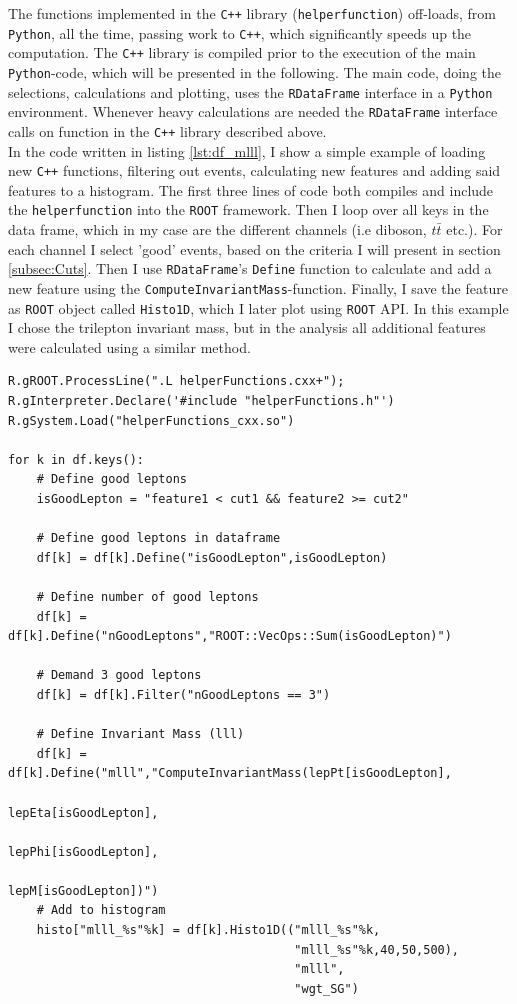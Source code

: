 The functions implemented in the \verb!C++! library (\texttt{helperfunction}) off-loads, from \verb!Python!, all the time, passing work to \verb!C++!,
which significantly speeds up the computation. The \verb!C++! library is compiled prior to the execution of the main \verb!Python!-code, which 
will be presented in the following. The main code, doing the selections, calculations and plotting, uses the \verb!RDataFrame! interface in a \verb!Python! 
environment. Whenever heavy calculations are needed the \verb!RDataFrame! interface calls on function in the \verb!C++! library described above. 
\\
In the code written in listing \ref{lst:df_mlll}, I show a simple example 
of loading new \verb!C++! functions, filtering out events, calculating new features and adding said 
features to a histogram. The first three lines of code both compiles and include the \texttt{helperfunction} 
into the \verb!ROOT! framework. Then I loop over all keys in the data frame, which in my case
are the different channels (i.e diboson, $t\bar{t}$ etc.). For each channel I select 'good' events,
based on the criteria I will present in section \ref{subsec:Cuts}. Then I use \verb!RDataFrame!'s \texttt{Define} function to calculate
and add a new feature using the \texttt{ComputeInvariantMass}-function. Finally, I save the feature as \verb!ROOT! object called 
\texttt{Histo1D}, which I later plot using \verb!ROOT! \ac{API}. In this example I chose the trilepton invariant mass, 
but in the analysis all additional features were calculated using a similar method. 
\lstset{style=Python}
\begin{lstlisting}[caption={Python-file for calling dataframe and calculating $M_{lll}$.},captionpos=b, label={lst:df_mlll}]
R.gROOT.ProcessLine(".L helperFunctions.cxx+");
R.gInterpreter.Declare('#include "helperFunctions.h"') 
R.gSystem.Load("helperFunctions_cxx.so")

for k in df.keys():
    # Define good leptons
    isGoodLepton = "feature1 < cut1 && feature2 >= cut2"

    # Define good leptons in dataframe
    df[k] = df[k].Define("isGoodLepton",isGoodLepton)

    # Define number of good leptons
    df[k] = df[k].Define("nGoodLeptons","ROOT::VecOps::Sum(isGoodLepton)")

    # Demand 3 good leptons 
    df[k] = df[k].Filter("nGoodLeptons == 3")

    # Define Invariant Mass (lll)
    df[k] = df[k].Define("mlll","ComputeInvariantMass(lepPt[isGoodLepton], 
                                                      lepEta[isGoodLepton], 
                                                      lepPhi[isGoodLepton], 
                                                      lepM[isGoodLepton])")
    # Add to histogram
    histo["mlll_%s"%k] = df[k].Histo1D(("mlll_%s"%k,
                                        "mlll_%s"%k,40,50,500),
                                        "mlll",
                                        "wgt_SG")     
\end{lstlisting}



